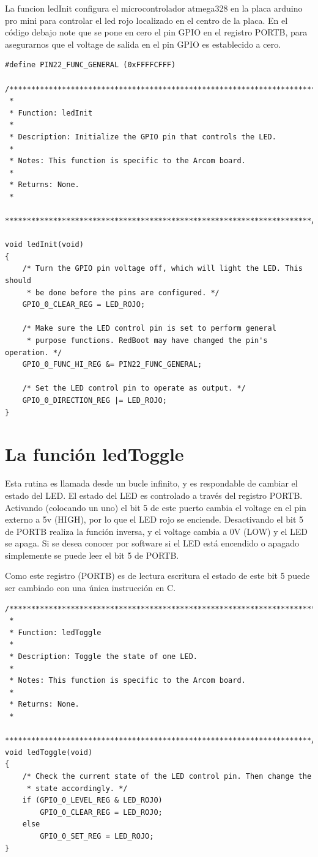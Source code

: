\documentclass[12pt]{article}
\begin{document}
La funcion ledInit configura el microcontrolador atmega328 en la placa
arduino pro mini para controlar el led rojo localizado en el centro de la placa.
En el código debajo note que se pone en cero el pin GPIO en el registro
PORTB, para asegurarnos que el voltage de salida en el pin GPIO es 
establecido a cero.


\begin{verbatim}
#define PIN22_FUNC_GENERAL (0xFFFFCFFF)

/**********************************************************************
 *
 * Function: ledInit
 *
 * Description: Initialize the GPIO pin that controls the LED.
 *
 * Notes: This function is specific to the Arcom board.
 *
 * Returns: None.
 *
 **********************************************************************/

void ledInit(void)
{
    /* Turn the GPIO pin voltage off, which will light the LED. This should
     * be done before the pins are configured. */
    GPIO_0_CLEAR_REG = LED_ROJO;

    /* Make sure the LED control pin is set to perform general
     * purpose functions. RedBoot may have changed the pin's operation. */
    GPIO_0_FUNC_HI_REG &= PIN22_FUNC_GENERAL;

    /* Set the LED control pin to operate as output. */
    GPIO_0_DIRECTION_REG |= LED_ROJO;
}
\end{verbatim}


\section *{La función ledToggle}

Esta rutina es llamada desde un bucle infinito, y es respondable de cambiar
el estado del LED. El estado del LED es controlado a través del registro
PORTB. Activando (colocando un uno) el bit 5 de este puerto cambia el voltage 
en el pin externo a 5v (HIGH), por lo que el LED rojo se enciende.
Desactivando el bit 5 de PORTB realiza la función inversa, y el voltage cambia
a 0V (LOW) y el LED se apaga.
Si se desea conocer por software si el LED está encendido o apagado simplemente
se puede leer el bit 5 de PORTB.

Como este registro (PORTB) es de lectura escritura el estado de este bit
5 puede ser cambiado con una única instrucción en C.

\begin{verbatim}
/**********************************************************************
 *
 * Function: ledToggle
 *
 * Description: Toggle the state of one LED.
 *
 * Notes: This function is specific to the Arcom board.
 *
 * Returns: None.
 *
 **********************************************************************/
void ledToggle(void)
{
    /* Check the current state of the LED control pin. Then change the
     * state accordingly. */
    if (GPIO_0_LEVEL_REG & LED_ROJO)
        GPIO_0_CLEAR_REG = LED_ROJO;
    else
        GPIO_0_SET_REG = LED_ROJO;
}
\end{verbatim}
\end{document}
